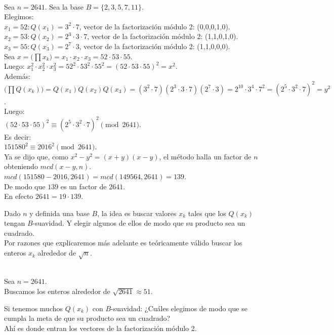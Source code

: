 \begin{ejemplo} \, \\
Sea $n=2641$. Sea la base $B = \{ 2,3,5,7,11 \}$. \\
Elegimos: \\
$x_1=52: Q(x_1)=3^2\cdot 7$, vector de la factorización módulo 2: (0,0,0,1,0). \\
$x_2=53: Q(x_2)=2^3\cdot 3\cdot 7$, vector de la factorización módulo 2: (1,1,0,1,0). \\
$x_3=55: Q(x_3)=2^7\cdot 3$, vector de la factorización módulo 2: (1,1,0,0,0). \\
Sea $x=\Big( \prod x_k\Big)=x_1 \cdot x_2 \cdot x_3 = 52\cdot53\cdot55$. \\
Luego: $x_1^2 \cdot x_2^2 \cdot x_3^2 = 52^2\cdot53^2\cdot55^2=(52\cdot53\cdot55)^2=x^2$. \\
Además: \\
$\Big(\prod Q(x_k)\Big)=Q(x_1)Q(x_2)Q(x_3) = (3^2\cdot 7)(2^3\cdot 3\cdot 7)(2^7\cdot 3)=2^{10}\cdot 3^4 \cdot 7^2 = (2^5 \cdot 3^2 \cdot 7)^2=y^2$. \\
Luego: \\
$(52\cdot53\cdot55)^2 \equiv (2^5 \cdot 3^2 \cdot 7)^2 \pmod {2641}$. \\
Es decir: \\
$151580^2 \equiv 2016^2 \pmod {2641}$. \\
Ya se dijo que, como $x^2 - y^2 = (x+y)(x-y)$, el método halla un factor de $n$ obteniendo $mcd(x-y,n)$. \\
$mcd(151580-2016,2641)=mcd(149564,2641)=139$. \\
De modo que $139$ es un factor de $2641$. \\
En efecto $2641 = 19 \cdot 139$.
\end{ejemplo}

Dado $n$ y definida una base $B$, la idea es buscar valores $x_k$ tales que los $Q(x_k)$ tengan $B$-suavidad. Y elegir algunos de ellos de modo que su producto sea un cuadrado. \\

Por razones que explicaremos más adelante es teóricamente válido buscar los enteros $x_k$ alrededor de $\sqrt n$. 

\begin{ejemplo} \, \\
Sea $n=2641$. \\
Buscamos los enteros alrededor de $\sqrt{2641} \approx 51$.
\end{ejemplo}

Si tenemos muchos $Q(x_k)$ con $B$-suavidad: ¿Cuáles elegimos de modo que se cumpla la meta de que su producto sea un cuadrado? \\
Ahí es donde entran los vectores de la factorización módulo 2. 

